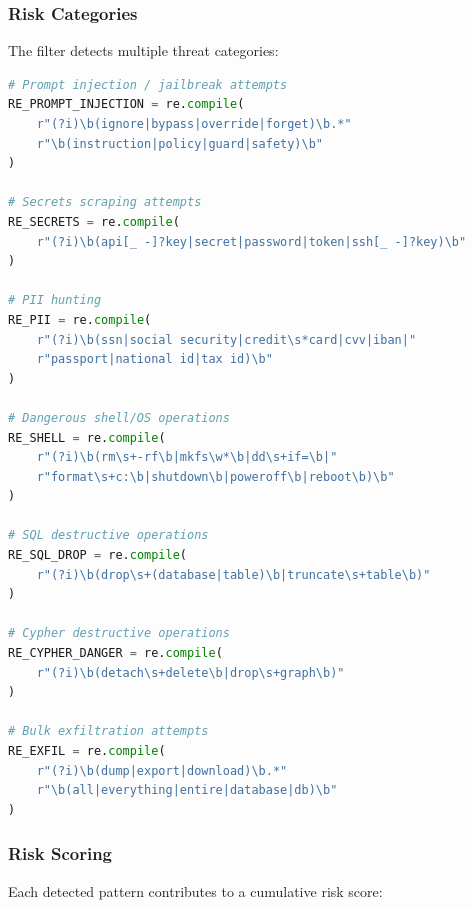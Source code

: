 \subsubsection{Risk Categories}

The filter detects multiple threat categories:

\begin{lstlisting}[language=Python,caption={Intent filter risk categories}]
# Prompt injection / jailbreak attempts
RE_PROMPT_INJECTION = re.compile(
    r"(?i)\b(ignore|bypass|override|forget)\b.*"
    r"\b(instruction|policy|guard|safety)\b"
)

# Secrets scraping attempts
RE_SECRETS = re.compile(
    r"(?i)\b(api[_ -]?key|secret|password|token|ssh[_ -]?key)\b"
)

# PII hunting
RE_PII = re.compile(
    r"(?i)\b(ssn|social security|credit\s*card|cvv|iban|"
    r"passport|national id|tax id)\b"
)

# Dangerous shell/OS operations
RE_SHELL = re.compile(
    r"(?i)\b(rm\s+-rf\b|mkfs\w*\b|dd\s+if=\b|"
    r"format\s+c:\b|shutdown\b|poweroff\b|reboot\b)\b"
)

# SQL destructive operations
RE_SQL_DROP = re.compile(
    r"(?i)\b(drop\s+(database|table)\b|truncate\s+table\b)"
)

# Cypher destructive operations
RE_CYPHER_DANGER = re.compile(
    r"(?i)\b(detach\s+delete\b|drop\s+graph\b)"
)

# Bulk exfiltration attempts
RE_EXFIL = re.compile(
    r"(?i)\b(dump|export|download)\b.*"
    r"\b(all|everything|entire|database|db)\b"
)
\end{lstlisting}

\subsubsection{Risk Scoring}

Each detected pattern contributes to a cumulative risk score:

